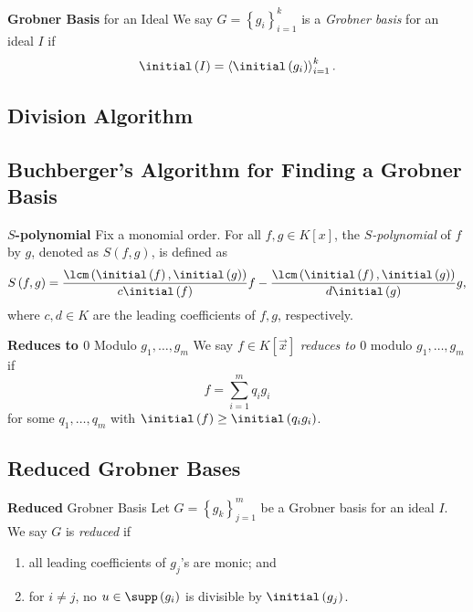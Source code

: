 \documentclass[11pt]{article}
\begin{document}
    \begin{definition}{\textbf{Grobner Basis} for an Ideal}
        We say $G=\left\lbrace g_i \right\rbrace^{k}_{i=1}$ is a \emph{Grobner basis} for an ideal $I$ if
        \begin{equation*}
            \initial\left( I \right) = \left< \initial\left( g_i \right) \right>^k_{i=1}. 
        \end{equation*}
    \end{definition}

    \subsection{Division Algorithm}
    
    \subsection{Buchberger's Algorithm for Finding a Grobner Basis}

    \begin{definition}{\textbf{$S$-polynomial}}
        Fix a monomial order. For all $f,g\in K\left[ x \right]$, the \emph{$S$-polynomial} of $f$ by $g$, denoted as $S\left( f,g \right)$, is defined as
        \begin{equation*}
            S\left( f,g \right) = \frac{\lcm\left( \initial\left( f \right),\initial\left( g \right) \right)}{c\initial\left( f \right)} f - \frac{\lcm\left( \initial\left( f \right),\initial\left( g \right) \right)}{d\initial\left( g \right)}g,
        \end{equation*}
        where $c,d\in K$ are the leading coefficients of $f,g$, respectively.
    \end{definition}
    
    \begin{definition}{\textbf{Reduces to $0$} Modulo $g_1,\ldots,g_m$}
        We say $f\in K\left[ \vec{x} \right]$ \emph{reduces to $0$} modulo $g_1,\ldots,g_m$ if
        \begin{equation*}
            f = \sum^{m}_{i=1} q_ig_i
        \end{equation*}
        for some $q_1,\ldots,q_m$ with $\initial\left( f \right)\geq\initial\left( q_ig_i \right)$.
    \end{definition}

    \subsection{Reduced Grobner Bases}
    
    \begin{definition}{\textbf{Reduced} Grobner Basis}
        Let $G = \left\lbrace g_k \right\rbrace^{m}_{j=1}$ be a Grobner basis for an ideal $I$. We say $G$ is \emph{reduced} if
        \begin{enumerate}
            \item all leading coefficients of $g_j$'s are monic; and
            \item for $i\neq j$, no $u\in\supp\left( g_i \right)$ is divisible by $\initial\left( g_j \right)$.
        \end{enumerate}
    \end{definition} 
    
\end{document}
